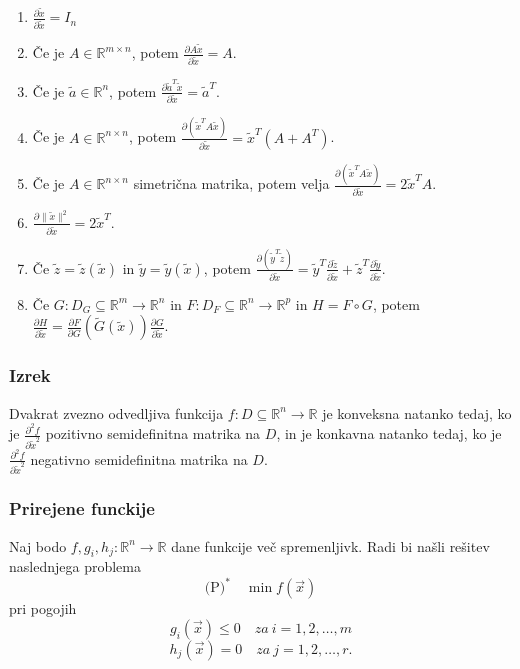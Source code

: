 \documentclass{article}
\begin{document}
\begin{multicols}{2}
	\begin{enumerate}
		\item \(\frac{\partial \tilde{x}}{\partial \tilde{x}} = I_n\)
		\item Če je \( A \in \mathbb{R}^{m \times n} \), potem \( \frac{\partial A\tilde{x}}{\partial \tilde{x}} = A \).
		\item Če je \( \tilde{a} \in \mathbb{R}^n \), potem \( \frac{\partial \tilde{a}^T\tilde{x}}{\partial \tilde{x}} = \tilde{a}^T \).
		\item Če je \( A \in \mathbb{R}^{n \times n} \), potem \( \frac{\partial (\tilde{x}^T A\tilde{x})}{\partial \tilde{x}} = \tilde{x}^T(A + A^T) \).
		\item Če je \( A \in \mathbb{R}^{n \times n} \) simetrična matrika, potem velja \( \frac{\partial (\tilde{x}^T A\tilde{x})}{\partial \tilde{x}} = 2\tilde{x}^T A \).
		\item \( \frac{\partial \|\tilde{x}\|^2}{\partial \tilde{x}} = 2\tilde{x}^T \).
		\item Če \( \tilde{z} = \tilde{z}(\tilde{x}) \) in \( \tilde{y} = \tilde{y}(\tilde{x}) \), potem \( \frac{\partial (\tilde{y}^T \tilde{z})}{\partial \tilde{x}} = \tilde{y}^T \frac{\partial \tilde{z}}{\partial \tilde{x}} + \tilde{z}^T \frac{\partial \tilde{y}}{\partial \tilde{x}} \).
		\item Če \( G: D_G \subseteq \mathbb{R}^m \rightarrow \mathbb{R}^n \) in \( F: D_F \subseteq \mathbb{R}^n \rightarrow \mathbb{R}^p \) in \( H = F \circ G \), potem \( \frac{\partial H}{\partial \tilde{x}} = \frac{\partial F}{\partial G} (\tilde{G}(\tilde{x})) \frac{\partial G}{\partial \tilde{x}} \).
	\end{enumerate}


	\subsubsection{Izrek}
	Dvakrat zvezno odvedljiva funkcija \( f: D \subseteq \mathbb{R}^n \rightarrow \mathbb{R} \) je konveksna natanko tedaj,
	ko je \( \frac{\partial^2 f}{\partial \tilde{x}^2} \) pozitivno semidefinitna matrika na \( D \), in je konkavna natanko tedaj,
	ko je \( \frac{\partial^2 f}{\partial \tilde{x}^2} \) negativno semidefinitna matrika na \( D \).

	\subsubsection{Prirejene funckije}

	Naj bodo \( f, g_i, h_j: \mathbb{R}^n \rightarrow \mathbb{R} \) dane funkcije več spremenljivk. Radi bi našli rešitev naslednjega problema
	\[
		\text{(P)}^* \quad \min f(\vec{x})
	\]
	pri pogojih
	\[
		g_i(\vec{x}) \leq 0 \quad za \ i = 1,2,\ldots,m
	\]
	\[
		h_j(\vec{x}) = 0 \quad za \ j = 1,2,\ldots,r.
	\]


\end{multicols}
\end{document}
